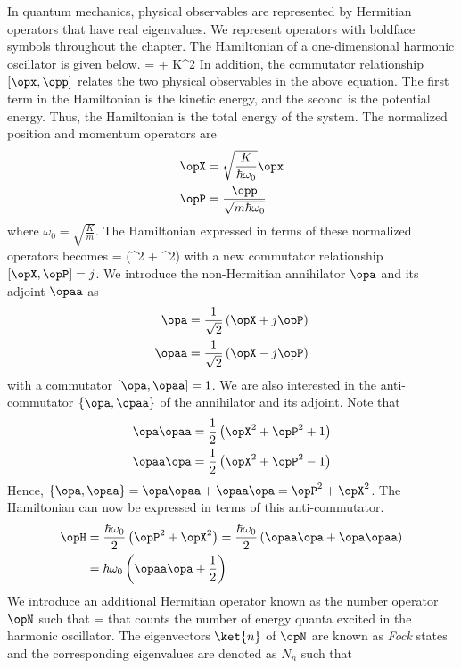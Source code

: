 In quantum mechanics, physical observables are represented by Hermitian operators that have real eigenvalues. We represent operators with boldface symbols throughout the chapter. The Hamiltonian of a one-dimensional harmonic oscillator is given below.
\beq
\opH =  + K\opx^2
\eeq
In addition, the commutator relationship $[\opx,\opp]$ relates the two physical observables in the above equation. The first term in the Hamiltonian is the kinetic energy, and the second is the potential energy. Thus, the Hamiltonian is the total energy of the system. The normalized position and momentum operators are
\begin{align}
\opX &= \sqrt{\frac{K}{\hbar\omega_0}}\opx\\
\opP &= \frac{\opp}{\sqrt{m\hbar\omega_0}}
\end{align}
where $\omega_0 = \sqrt{\frac{K}{m}}$. The Hamiltonian expressed in terms of these normalized operators becomes
\beq
\opH = \left(\opP^2 + \opX^2\right)
\eeq
with a new commutator relationship $[\opX,\opP] = j$. We introduce the non-Hermitian annihilator $\opa$ and its adjoint $\opaa$ as
\begin{align}
\opa &= \frac{1}{\sqrt{2}}\left(\opX + j\opP\right)\\
\opaa &= \frac{1}{\sqrt{2}}\left(\opX - j\opP\right)
\end{align}
with a commutator $[\opa,\opaa]=1$. We are also interested in the anti-commutator $\{\opa,\opaa\}$ of the annihilator and its adjoint. Note that
\begin{align}
\opa\opaa &= \frac{1}{2}\left(\opX^2+\opP^2+1\right)\\
\opaa\opa &= \frac{1}{2}\left(\opX^2+\opP^2-1\right)
\end{align}
Hence, $\{\opa,\opaa\} = \opa\opaa+\opaa\opa = \opP^2 + \opX^2$. The Hamiltonian can now be expressed in terms of this anti-commutator.
\begin{align}
\opH &= \frac{\hbar\omega_0}{2}\left(\opP^2 + \opX^2\right) = \frac{\hbar\omega_0}{2}\left(\opaa\opa + \opa\opaa\right)\\
&= \hbar\omega_0\left(\opaa\opa + \frac{1}{2}\right)
\end{align}
We introduce an additional Hermitian operator known as the number operator $\opN$ such that
\beq
\opN = \opaa\opa
\eeq
that counts the number of energy quanta excited in the harmonic oscillator. The eigenvectors $\ket{n}$ of $\opN$ are known as \textit{Fock} states and the corresponding eigenvalues are denoted as $N_n$ such that
